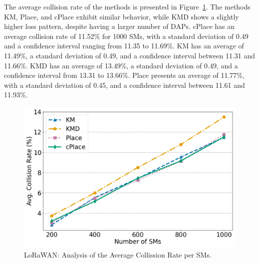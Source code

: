 \documentclass[a4paper,fleqn]{cas-dc}
\begin{document}
The average collision rate of the methods is presented in Figure~\ref{fig:coll}. The methods KM, Place, and cPlace exhibit similar behavior, while KMD shows a slightly higher loss pattern, despite having a larger number of \gls{DAPs}. cPlace has an average collision rate of 11.52\% for 1000 \gls{SMs}, with a standard deviation of 0.49 and a confidence interval ranging from 11.35 to 11.69\%. KM has an average of 11.49\%, a standard deviation of 0.49, and a confidence interval between 11.31 and 11.66\%. KMD has an average of 13.49\%, a standard deviation of 0.49, and a confidence interval from 13.31 to 13.66\%. Place presents an average of 11.77\%, with a standard deviation of 0.45, and a confidence interval between 11.61 and 11.93\%.

\begin{figure}
    \centering
    \includegraphics[width=0.99\linewidth]{imgs/coll.png}
    \caption{LoRaWAN: Analysis of the Average Collission Rate per \gls{SMs}.}
    \label{fig:coll}
\end{figure}
\end{document}
